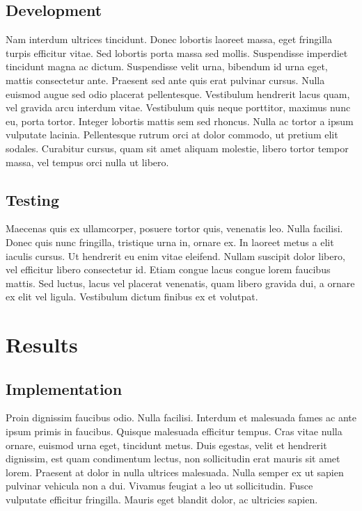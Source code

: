 \subsection{Development}
Nam interdum ultrices tincidunt. Donec lobortis laoreet massa, eget fringilla turpis efficitur vitae. Sed lobortis porta massa sed mollis. Suspendisse imperdiet tincidunt magna ac dictum. Suspendisse velit urna, bibendum id urna eget, mattis consectetur ante. Praesent sed ante quis erat pulvinar cursus. Nulla euismod augue sed odio placerat pellentesque. Vestibulum hendrerit lacus quam, vel gravida arcu interdum vitae. Vestibulum quis neque porttitor, maximus nunc eu, porta tortor. Integer lobortis mattis sem sed rhoncus. Nulla ac tortor a ipsum vulputate lacinia. Pellentesque rutrum orci at dolor commodo, ut pretium elit sodales. Curabitur cursus, quam sit amet aliquam molestie, libero tortor tempor massa, vel tempus orci nulla ut libero.

\subsection{Testing}
Maecenas quis ex ullamcorper, posuere tortor quis, venenatis leo. Nulla facilisi. Donec quis nunc fringilla, tristique urna in, ornare ex. In laoreet metus a elit iaculis cursus. Ut hendrerit eu enim vitae eleifend. Nullam suscipit dolor libero, vel efficitur libero consectetur id. Etiam congue lacus congue lorem faucibus mattis. Sed luctus, lacus vel placerat venenatis, quam libero gravida dui, a ornare ex elit vel ligula. Vestibulum dictum finibus ex et volutpat.


\section{Results}

\subsection{Implementation}
Proin dignissim faucibus odio. Nulla facilisi. Interdum et malesuada fames ac ante ipsum primis in faucibus. Quisque malesuada efficitur tempus. Cras vitae nulla ornare, euismod urna eget, tincidunt metus. Duis egestas, velit et hendrerit dignissim, est quam condimentum lectus, non sollicitudin erat mauris sit amet lorem. Praesent at dolor in nulla ultrices malesuada. Nulla semper ex ut sapien pulvinar vehicula non a dui. Vivamus feugiat a leo ut sollicitudin. Fusce vulputate efficitur fringilla. Mauris eget blandit dolor, ac ultricies sapien.

